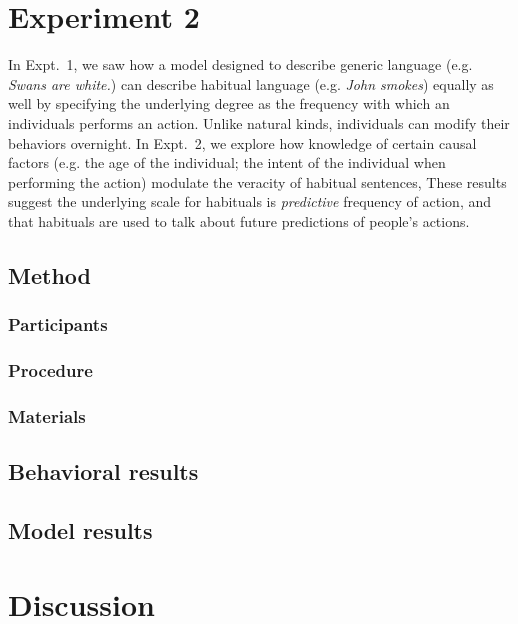 \documentclass[10pt,letterpaper]{article}
\begin{document}
\section{Experiment 2}

In Expt.~1, we saw how a model designed to describe generic language (e.g. \emph{Swans are white.}) can describe habitual language (e.g. \emph{John smokes}) equally as well by specifying the underlying degree as the frequency with which an individuals performs an action.
Unlike natural kinds, individuals can modify their behaviors overnight.  
In Expt.~2, we explore how knowledge of certain causal factors (e.g. the age of the individual; the intent of the individual when performing the action) modulate the veracity of habitual sentences, 
These results suggest the underlying scale for habituals is \emph{predictive} frequency of action, and that habituals are used to talk about future predictions of people's actions.

\subsection{Method}


\subsubsection{Participants}
\subsubsection{Procedure}
\subsubsection{Materials}

\subsection{Behavioral results}

\subsection{Model results}



\section{Discussion}



\setlength{\bibleftmargin}{.125in}
\setlength{\bibindent}{-\bibleftmargin}


\end{document}
